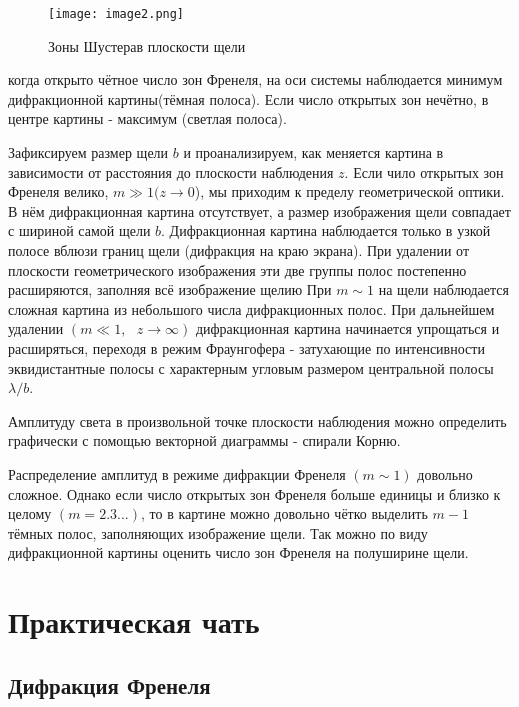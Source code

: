 \documentclass[a4paper,12pt]{article} %
\begin{document}
\begin{figure}
\begin{center}
    \texttt{[image: image2.png]}
\end{center}
    \caption{Зоны Шустерав плоскости щели}
    \label{img2}
\end{figure}

когда открыто $\text{чётное}$ число зон Френеля, на оси системы наблюдается $\text{минимум}$ дифракционной картины(тёмная полоса). Если число открытых зон $\text{нечётно}$, в центре картины - $\text{максимум}$ (светлая полоса).

Зафиксируем размер щели $b$ и проанализируем, как меняется картина в зависимости от расстояния до плоскости наблюдения $z$. Если чило открытых зон Френеля велико, $m \gg 1 (z\rightarrow0$), мы приходим к пределу геометрической оптики. В нём дифракционная картина отсутствует, а размер изображения щели совпадает с шириной самой щели $b$. Дифракционная картина наблюдается только в узкой полосе вблюзи границ щели (дифракция на краю экрана). При удалении от плоскости геометрического изображения эти две группы полос постепенно расширяются, заполняя всё изображение щелию При $m\sim1$ на щели наблюдается сложная картина из небольшого числа дифракционных полос. При дальнейшем удалении $(m\ll1,\text{ }z\rightarrow\infty)$ дифракционная картина начинается упрощаться и расширяться, переходя в режим $\text{Фраунгофера}$ - затухающие по  интенсивности эквидистантные полосы с характерным угловым размером центральной полосы $\lambda/b$.

Амплитуду света в произвольной точке плоскости наблюдения можно определить графически с помощью векторной диаграммы - $\text{спирали Корню}$.

Распределение амплитуд в режиме дифракции Френеля $(m\sim1)$ довольно сложное. Однако если число открытых зон Френеля больше единицы и близко к целому $(m=2.3...)$, то в картине можно довольно чётко выделить $m-1$ тёмных полос, заполняющих изображение щели. Так можно по виду дифракционной картины оценить число зон Френеля на полуширине щели.

\section{Практическая чать}

\subsection{Дифракция Френеля}
\end{document}
